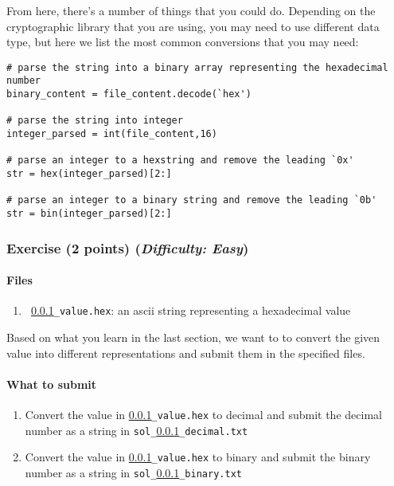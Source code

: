 \documentclass[letterpaper,12pt]{report}
\begin{document}
From here, there's a number of things that you could do. Depending on the cryptographic library that you are using, you may need to use different data type, but here we list the most common conversions that you may need:
\begin{mdframed}
\begin{verbatim}
# parse the string into a binary array representing the hexadecimal number
binary_content = file_content.decode(`hex') 

# parse the string into integer
integer_parsed = int(file_content,16)

# parse an integer to a hexstring and remove the leading `0x'           
str = hex(integer_parsed)[2:]

# parse an integer to a binary string and remove the leading `0b'
str = bin(integer_parsed)[2:]
\end{verbatim}
\end{mdframed}

\pagebreak

\subsubsection{Exercise  (2 points)  \hfill\rm\normalsize (\emph{Difficulty: Easy})}
\label{sec:python_exercise}
\paragraph{Files}

\begin{enumerate}
\item \texttt{ \ref{sec:python_exercise}\_value.hex}: an ascii string representing a hexadecimal value
\end{enumerate}

Based on what you learn in the last section, we want to to convert the given value into different representations and submit them in the specified files.

\paragraph{What to submit}
\begin{enumerate}
\item Convert the value in {\tt \ref{sec:python_exercise}\_value.hex} to decimal and submit the decimal number as a string in \texttt{sol\_\ref{sec:python_exercise}\_decimal.txt}

\item Convert the value in {\tt \ref{sec:python_exercise}\_value.hex} to binary and submit the binary number as a string in \texttt{sol\_\ref{sec:python_exercise}\_binary.txt}
\end{enumerate}
\end{document}
